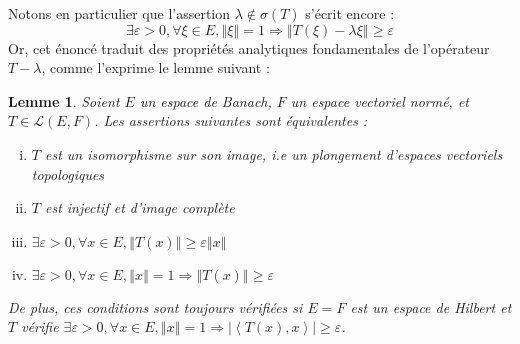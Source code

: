 \documentclass[a4paper,12pt]{article}
\newtheorem{lemma}[theorem]{Lemme}
\newcommand{\norm}[1]{\left\Vert #1\right\Vert}
\newcommand{\abs}[1]{\left\vert#1\right\vert}
\newcommand{\ket}[1]{\left\langle #1 \right\rangle}
\renewcommand{\implies}{\Rightarrow}
\begin{document}
Notons en particulier que l'assertion $\lambda\notin\sigma(T)$ s'écrit encore :
\begin{equation*}
    \exists\varepsilon>0, \forall\xi\in E, \norm{\xi}=1\implies \norm{T(\xi)-\lambda\xi}\geq\varepsilon
\end{equation*}
Or, cet énoncé traduit des propriétés analytiques fondamentales de l'opérateur $T - \lambda$, comme l'exprime le lemme suivant :

\begin{lemma}\label{EVT_emb_TFAE}
    Soient $E$ un espace de Banach, $F$ un espace vectoriel normé, et $T\in\mathcal{L}(E, F)$. Les assertions suivantes sont équivalentes :
    \begin{enumerate}[(i)]
        \item $T$ est un isomorphisme sur son image, i.e un plongement d'espaces vectoriels topologiques \label{EVT_emb_TFAE/emb}
        \item $T$ est injectif et d'image complète \label{EVT_emb_TFAE/closed_range_inj}
        \item $\exists\varepsilon>0, \forall x\in E, \norm{T(x)}\geq\varepsilon\norm{x}$ \label{EVT_emb_TFAE/lower_bound_norm}
        \item $\exists\varepsilon>0, \forall x\in E, \norm{x} = 1 \implies \norm{T(x)}\geq\varepsilon$ \label{EVT_emb_TFAE/lower_bound_norm'}
    \end{enumerate}
    De plus, ces conditions sont toujours vérifiées si $E=F$ est un espace de Hilbert et $T$ vérifie $\exists\varepsilon>0, \forall x\in E, \norm{x} = 1 \implies \abs{\ket{T(x), x}}\ge\varepsilon$.
\end{lemma}
\end{document}
